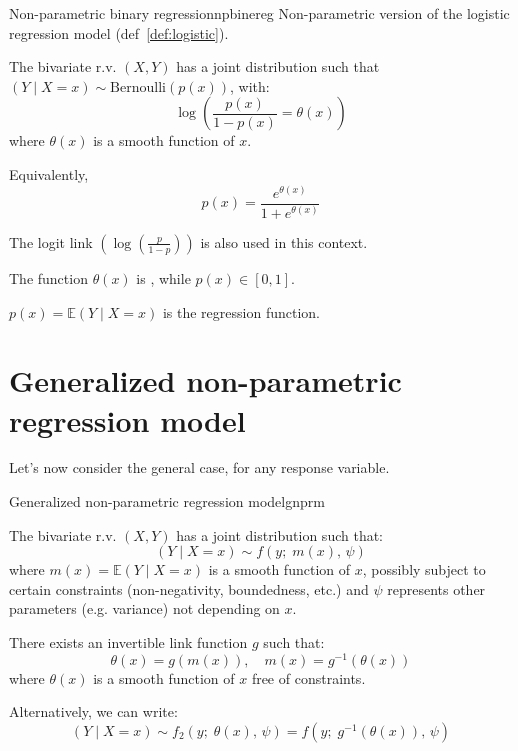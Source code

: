 \begin{definition}{Non-parametric binary regression}{npbinereg} 
    Non-parametric version of the logistic regression model (def~\ref{def:logistic}).

    The bivariate r.v. $(X, Y)$ has a joint distribution such that
    $(Y \mid X = x) \sim \text{Bernoulli}(p(x))$, with:
    \begin{equation*}
        \log\left(
            \frac{p(x)}{1 - p(x)} = \theta(x)
        \right)
    \end{equation*}
    where $\theta(x)$ is a smooth function of $x$.

    Equivalently,
    \begin{equation*}
        p(x) = \frac{e^{\theta(x)}}{1 + e^{\theta(x)}}
    \end{equation*}

    \tcblower

    The logit link $\left(\log\left(\frac{p}{1 - p}\right)\right)$ is also used in this context.

    The function $\theta(x)$ is , while $p(x) \in [0, 1]$.

    $p(x) = \mathds{E}(Y \mid X = x)$ is the regression function.
\end{definition}


\pagebreak
\section{Generalized non-parametric regression model}
Let's now consider the general case, for any response variable.

\begin{definition}{Generalized non-parametric regression model}{gnprm}

    The bivariate r.v. $(X, Y)$ has a joint distribution such that:
    \begin{equation*}
        (Y \mid X = x) \sim f(y;\; m(x),\, \psi)
    \end{equation*}
    where $m(x) = \mathds{E}(Y \mid X = x)$ is a smooth function of $x$,
    possibly subject to certain constraints (non-negativity, boundedness, etc.)
    and $\psi$ represents other parameters (e.g. variance) not depending on $x$.

    There exists an invertible link function $g$ such that:
    \begin{equation*}
        \theta(x) = g(m(x)), \quad m(x) = g^{-1}(\theta(x))
    \end{equation*}
    where $\theta(x)$ is a smooth function of $x$ free of constraints.

    \tcblower

    Alternatively, we can write:
    \begin{equation*}
        (Y \mid X = x) \sim f_2(y;\; \theta(x),\, \psi) = f(y;\; g^{-1}(\theta(x)),\, \psi)
    \end{equation*}

\end{definition}

